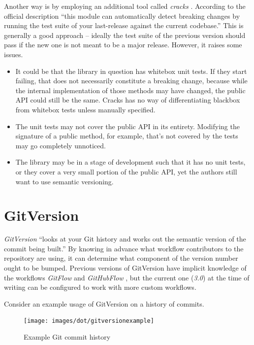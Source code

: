 \documentclass{l4proj}
\begin{document}
Another way is by employing an additional tool called
\textit{cracks} \cite{Cracks}. According to the official description
``this module can automatically detect breaking changes by running the
test suite of your last-release against the current codebase.''
This is generally a good approach -- ideally
the test suite of the previous version should pass if the new one is
not meant to be a major release. However, it raises some issues.

\begin{itemize}
\item It could be that the library in question has whitebox unit
tests. If they start failing, that does not necessarily constitute a
breaking change, because while the internal implementation of those
methods may have changed, the public API could still be the same. Cracks has
no way of differentiating blackbox from whitebox tests unless manually
specified.
\item The unit tests may not cover the public API in its entirety.
Modifying the signature of a public method, for example, that's not
covered by the tests may go completely unnoticed.
\item The library may be in a stage of development such that it has no
unit tests, or they cover a very small portion of the public API, yet
the authors still want to use semantic versioning.
\end{itemize}

\section{GitVersion}

\textit{GitVersion} \cite{GitVersion} ``looks at your Git history and
works out the semantic version of the commit being built.'' By knowing
in advance what workflow contributors to the repository are using, it
can determine what component of the version number ought to be bumped.
Previous versions of GitVersion have implicit knowledge of the
workflows \textit{GitFlow} \cite{GitFlow} and \textit{GitHubFlow}
\cite{GitHubFlow}, but the current one (\textit{3.0}) at the time of
writing can be configured to work with more custom workflows.

Consider an example usage of GitVersion on a history of commits.

\begin{figure}[H]
\centering
\texttt{[image: images/dot/gitversionexample]}
\caption{Example Git commit history}
\end{figure}
\end{document}

